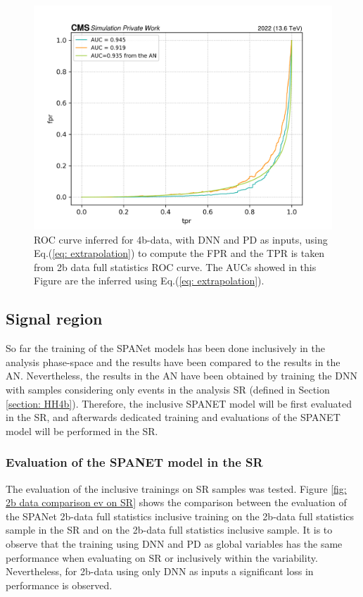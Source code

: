 \begin{figure}[hbt]
    \centering
    \includegraphics[width=0.7\linewidth]{Images/7.S:B/Extrapolation/4b data dnn proba.png}
    \caption{ROC curve inferred for 4b-data, with DNN and PD as inputs, using Eq.(\ref{eq: extrapolation}) to compute the FPR and the TPR is taken from 2b data full statistics ROC curve. The AUCs showed in this Figure are the inferred using Eq.(\ref{eq: extrapolation}).}
    \label{fig: 4b data extrapolation DNN PD}
\end{figure}


\clearpage

\subsection{Signal region}

So far the training of the SPANet models has been done inclusively in the analysis phase-space and the results have been compared to the results in the AN. Nevertheless, the results in the AN have been obtained by training the DNN with samples considering only events in the analysis SR (defined in Section \ref{section: HH4b}). Therefore, the inclusive SPANET model will be first evaluated in the SR, and afterwards dedicated training and evaluations of the SPANET model will be performed in the SR.


\subsubsection{Evaluation of the SPANET model in the SR}

The evaluation of the inclusive trainings on SR samples was tested. Figure \ref{fig: 2b data comparison ev on SR} shows the comparison between the evaluation of the SPANet 2b-data full statistics inclusive training on the 2b-data full statistics sample in the SR and on the 2b-data full statistics inclusive sample. It is to observe that the training using DNN and PD as global variables has the same performance when evaluating on SR or inclusively within the variability. Nevertheless, for 2b-data using only DNN as inputs a significant loss in performance is observed.

